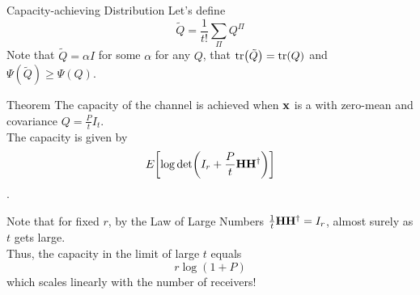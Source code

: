 \begin{frame}[allowframebreaks]{Capacity-achieving Distribution}
\medskip
Let's define
$$\tilde{Q} = \frac{1}{t!}\sum_\Pi Q^\Pi$$
Note that $\tilde{Q}=\alpha I$ for some $\alpha$ for any $Q$, that $\tr(\tilde{Q})=\tr(Q)$ and $\Psi(\tilde{Q})\geq\Psi(Q)$.

\framebreak

\begin{alertblock}{Theorem}
	The capacity of the channel is achieved when $\vb{x}$ is a \cscg{} with zero-mean and covariance $Q=\frac{P}{t}I_t$.\\
	The capacity is given by
	$$E_{}\qty[\log\det(I_r + \frac{P}{t}\vb{H\ensuremath{H^\dagger}})]$$.
\end{alertblock}

Note that for fixed $r$, by the Law of Large Numbers $\frac{1}{t}\vb{H\ensuremath{H^\dagger}} = I_r$, almost surely as $t$ gets large.\\ Thus, the capacity in the limit of large $t$ equals
$$r\log(1+P)$$
which scales linearly with the number of receivers!

\end{frame}

